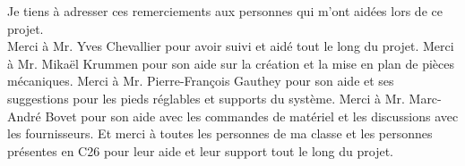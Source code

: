 Je tiens à adresser ces remerciements aux personnes qui m'ont aidées lors de ce projet.\\

Merci à Mr. Yves Chevallier pour avoir suivi et aidé tout le long du projet.
\newline
Merci à Mr. Mikaël Krummen pour son aide sur la création et la mise en plan de pièces mécaniques.
\newline
Merci à Mr. Pierre-François Gauthey pour son aide et ses suggestions pour les pieds réglables et supports du système.
\newline
Merci à Mr. Marc-André Bovet pour son aide avec les commandes de matériel et les discussions avec les fournisseurs.
\newline
Et merci à toutes les personnes de ma classe et les personnes présentes en C26 pour leur aide et leur support tout le long du projet.